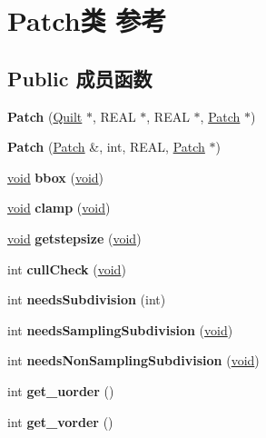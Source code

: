 \hypertarget{class_patch}{}\section{Patch类 参考}
\label{class_patch}
\subsection*{Public 成员函数}
\begin{DoxyCompactItemize}
\item 
\mbox{\label{class_patch_a108dc524d5a9c6aaf7e621af9d775e1a}} 
{\bfseries Patch} (\hyperlink{class_quilt}{Quilt} $\ast$, R\+E\+AL $\ast$, R\+E\+AL $\ast$, \hyperlink{class_patch}{Patch} $\ast$)
\item 
\mbox{\label{class_patch_ad871103cabbaa0785e0cbeb182e457e9}} 
{\bfseries Patch} (\hyperlink{class_patch}{Patch} \&, int, R\+E\+AL, \hyperlink{class_patch}{Patch} $\ast$)
\item 
\mbox{\label{class_patch_abe6aff8db6753cbb56926b2381095ba3}} 
\hyperlink{interfacevoid}{void} {\bfseries bbox} (\hyperlink{interfacevoid}{void})
\item 
\mbox{\label{class_patch_a885f6a4a2062789a5b00e0185a869be0}} 
\hyperlink{interfacevoid}{void} {\bfseries clamp} (\hyperlink{interfacevoid}{void})
\item 
\mbox{\label{class_patch_ae38c7636b59368ff27f9ca8ad2bad37a}} 
\hyperlink{interfacevoid}{void} {\bfseries getstepsize} (\hyperlink{interfacevoid}{void})
\item 
\mbox{\label{class_patch_a20e50704ef5e239e85f95be026aa5025}} 
int {\bfseries cull\+Check} (\hyperlink{interfacevoid}{void})
\item 
\mbox{\label{class_patch_ab3a12f0d2d1de8d5481af6685232bfb4}} 
int {\bfseries needs\+Subdivision} (int)
\item 
\mbox{\label{class_patch_a9b3ce77915541cf4d3c9b026edcd1789}} 
int {\bfseries needs\+Sampling\+Subdivision} (\hyperlink{interfacevoid}{void})
\item 
\mbox{\label{class_patch_a172b1c690c4fe692701180287df1a19b}} 
int {\bfseries needs\+Non\+Sampling\+Subdivision} (\hyperlink{interfacevoid}{void})
\item 
\mbox{\label{class_patch_a735bb4e402611d24286a5c3aa86ea183}} 
int {\bfseries get\+\_\+uorder} ()
\item 
\mbox{\label{class_patch_ac36b676196d2f595ead02112a56b4089}} 
int {\bfseries get\+\_\+vorder} ()
\end{DoxyCompactItemize}
